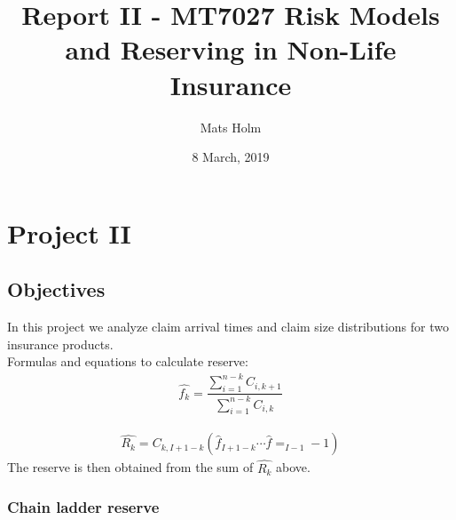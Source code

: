 \documentclass[a4paper]{article}
\title{Report II - MT7027 Risk Models and Reserving in Non-Life Insurance}
\author{Mats Holm}
\date{8 March, 2019}                                           %
\begin{document}
\maketitle
\section*{Project II}
\subsection*{Objectives}
In this project we analyze claim
arrival times and claim size distributions for two insurance products.
\\


Formulas and equations to calculate reserve:
\begin{align*}
	\hat{f_k} = \dfrac{\sum_{i=1}^{n-k} C_{i,k+1}} {\sum_{i=1}^{n-k} C_{i,k}}
\end{align*}

\begin{align*}
	\hat{R_k} = C_{k,I+1-k} \left(  \hat{f}_{I+1-k} \cdots \hat{f}=_{I-1}-1\right)
\end{align*}
The reserve is then obtained from the sum of $\hat{R_k}$ above.

\subsubsection*{Chain ladder reserve}
\end{document}
